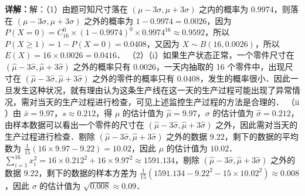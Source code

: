 \begin{question}[points=12]
\begin{solution}
\textbf{详解：}解：（1）由题可知尺寸落在 $(\mu-3\sigma,\mu+3\sigma)$ 之内的概率为 $0.9974$，则落在 $(\mu-3\sigma,\mu+3\sigma)$ 之外的概率为 $1-0.9974=0.0026$，因为 $P(X=0)=C_{16}^0\times(1-0.9974)^0\times0.9974^{16}\approx0.9592$，所以 $P(X\geq1)=1-P(X=0)=0.0408$，又因为 $X\sim B(16,0.0026)$，所以 $E(X)=16\times0.0026=0.0416$．
（2）（$\text{i}$）如果生产状态正常，一个零件尺寸在 $(\hat{\mu}-3\hat{\sigma},\hat{\mu}+3\hat{\sigma})$ 之外的概率只有 $0.0026$，一天内抽取的 16 个零件中，出现尺寸在 $(\hat{\mu}-3\hat{\sigma},\hat{\mu}+3\hat{\sigma})$ 之外的零件的概率只有 $0.0408$，发生的概率很小．因此一旦发生这种状况，就有理由认为这条生产线在这一天的生产过程可能出现了异常情况，需对当天的生产过程进行检查，可见上述监控生产过程的方法是合理的．
（$\text{ii}$）由 $\bar{x}=9.97$，$s\approx0.212$，得 $\mu$ 的估计值为 $\hat{\mu}=9.97$，$\sigma$ 的估计值为 $\hat{\sigma}=0.212$，由样本数据可以看出一个零件的尺寸在 $(\hat{\mu}-3\hat{\sigma},\hat{\mu}+3\hat{\sigma})$ 之外，因此需对当天的生产过程进行检查．剔除 $(\hat{\mu}-3\hat{\sigma},\hat{\mu}+3\hat{\sigma})$ 之外的数据 $9.22$，剩下的数据的平均数为 $\frac{1}{15}(16\times9.97-9.22)=10.02$，因此 $\mu$ 的估计值为 $10.02$．$\sum_{i=1}^{16}x_i^2=16\times0.212^2+16\times9.97^2\approx1591.134$，剔除 $(\hat{\mu}-3\hat{\sigma},\hat{\mu}+3\hat{\sigma})$ 之外的数据 $9.22$，剩下的数据的样本方差为 $\frac{1}{15}(1591.134-9.22^2-15\times10.02^2)\approx0.008$，因此 $\sigma$ 的估计值为 $\sqrt{0.008}\approx0.09$．
\end{solution}
\end{question}

